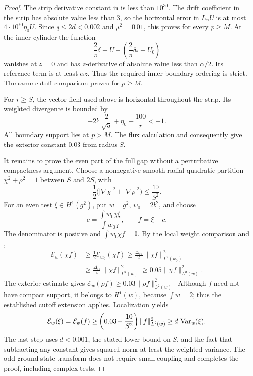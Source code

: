 \begin{proof}
The strip derivative constant in  is less
than \(10^{30}\).  The drift coefficient in the strip has absolute
value less than \(3\), so the horizontal error in \(L_nU\) is at
most \(4\cdot10^{30}\eta_0U\).  Since \(q\le2d<0.002\) and
\(\mu^2=0.01\), this proves 
for every \(p\ge M\).
At the inner cylinder the function
\[
 \frac2\pi\delta-U
       -\left(\frac2\pi\delta_*-U_0\right)
\]
vanishes at \(z=0\) and has \(z\)-derivative of absolute value less
than \(\alpha/2\).  Its reference term is at least \(\alpha z\).
Thus the required inner boundary ordering is strict.
The same cutoff comparison proves
 for \(p\ge M\).

For \(r\ge S\), the vector field used above is horizontal throughout
the strip.  Its weighted divergence is bounded by
\[
 -2k\,\frac2{\sqrt5}+\eta_0+\frac{100}{r}<-1.
\]
All boundary support lies at \(p>M\).  The flux calculation and
 consequently give the exterior
constant \(0.03\) from radius \(S\).

It remains to prove the even part of the full gap without a
perturbative compactness argument.  Choose a nonnegative smooth
radial quadratic partition \(\chi^2+\rho^2=1\) between \(S\) and
\(2S\), with
\[
 \frac12\bigl(|\nabla\chi|^2+|\nabla\rho|^2\bigr)
       \le\frac{10}{S^2}.
\]
For an even test \(\xi\in H^1(g^2)\), put \(w=g^2\), \(w_0=2b^2\),
and choose
\[
 c=\frac{\int w_0\chi\xi}{\int w_0\chi},
 \qquad f=\xi-c.
\]
The denominator is positive and \(\int w_0\chi f=0\).
By the local weight comparison and
,
\[
 \begin{aligned}
 \mathcal E_w(\chi f)
 &\ge\frac12\mathcal E_{w_0}(\chi f)
 \ge\frac{\Delta_{\mathrm{ev}}}{2}
               \|\chi f\|_{L^2(w_0)}^2\\
 &\ge\frac{\Delta_{\mathrm{ev}}}{4}
               \|\chi f\|_{L^2(w)}^2
 \ge0.05\|\chi f\|_{L^2(w)}^2.
 \end{aligned}
\]
The exterior estimate gives
\(\mathcal E_w(\rho f)\ge0.03\|\rho f\|_{L^2(w)}^2\).
Although \(f\) need not have compact support, it belongs to
\(H^1(w)\), because \(\int w=2\); thus the established cutoff
extension applies.  Localization yields
\[
 \mathcal E_w(\xi)=\mathcal E_w(f)
 \ge\left(0.03-\frac{10}{S^2}\right)\|f\|_{L^2(w)}^2
 \ge d\,\operatorname{Var}_w(\xi).
\]
The last step uses \(d<0.001\), the stated lower bound on \(S\),
and the fact that subtracting any constant gives squared norm at
least the weighted variance.  The odd ground-state transform
 does not require small coupling and
completes the proof, including complex tests.
\end{proof}
